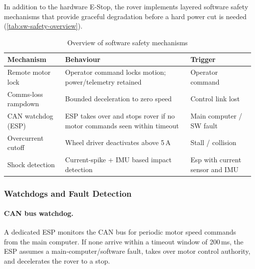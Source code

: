 %

In addition to the hardware E-Stop, the rover implements layered software safety mechanisms that provide graceful degradation before a hard power cut is needed (\autoref{tab:sw-safety-overview}).

\begin{table}[h]
	\footnotesize
	\centering
	\caption{Overview of software safety mechanisms}
	\label{tab:sw-safety-overview}
	\begin{tabularx}{\linewidth}{@{}p{3cm} X p{3cm}@{}}
		\toprule
		\textbf{Mechanism} & \textbf{Behaviour} & \textbf{Trigger} \\
		\midrule
		Remote motor lock & Operator command locks motion; power/telemetry retained & Operator command \\
		Comms-loss rampdown & Bounded deceleration to zero speed & Control link lost \\
		CAN watchdog (ESP) & ESP takes over and stops rover if no motor commands seen within timeout & Main computer / SW fault \\
		Overcurrent cutoff & Wheel driver deactivates above 5\,\si{\ampere} & Stall / collision \\
		Shock detection & Current-spike + IMU based impact detection & Esp with current sensor and IMU \\
		\bottomrule
	\end{tabularx}
\end{table}

\subsubsection{Watchdogs and Fault Detection}
\label{sec:sw-watchdog}

\paragraph{CAN bus watchdog.} A dedicated ESP monitors the CAN bus for periodic motor speed commands from the main computer. If none arrive within a timeout window of 200\,\si{\milli\second}, the ESP assumes a main-computer/software fault, takes over motor control authority, and decelerates the rover to a stop.

